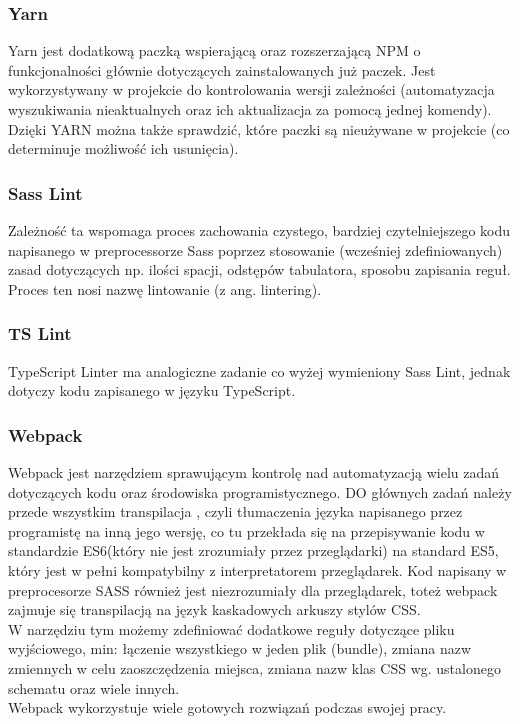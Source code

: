 \documentclass[eng,printmode]{mgr}
\begin{document}
\subsubsection{Yarn}
Yarn \cite{Yarn} jest dodatkową paczką wspierającą oraz rozszerzającą NPM o funkcjonalności głównie dotyczących  zainstalowanych już paczek. Jest wykorzystywany w projekcie do kontrolowania wersji zależności (automatyzacja wyszukiwania nieaktualnych oraz ich aktualizacja za pomocą jednej komendy). Dzięki YARN można także sprawdzić, które paczki są nieużywane w projekcie (co determinuje możliwość ich usunięcia).

\subsubsection{Sass Lint}
Zależność ta \cite{SassLint} wspomaga proces zachowania czystego, bardziej czytelniejszego kodu napisanego w preprocessorze  Sass poprzez stosowanie (wcześniej zdefiniowanych) zasad dotyczących np. ilości spacji, odstępów tabulatora, sposobu zapisania reguł. Proces ten nosi nazwę lintowanie (z ang. lintering).

\subsubsection{TS Lint}
TypeScript Linter \cite{TSLint} ma analogiczne zadanie co wyżej wymieniony Sass Lint, jednak dotyczy kodu zapisanego w języku TypeScript.

\subsubsection{Webpack}
Webpack \cite{Webpack} jest narzędziem sprawującym kontrolę nad automatyzacją wielu zadań dotyczących kodu oraz środowiska programistycznego. DO głównych zadań należy przede wszystkim transpilacja \cite{Keyword_Transpile}, czyli tłumaczenia języka napisanego przez programistę na inną jego wersję, co tu przekłada się na przepisywanie kodu w standardzie ES6(który nie jest zrozumiały przez przeglądarki) na standard ES5, który jest w pełni kompatybilny z interpretatorem przeglądarek. Kod napisany w preprocesorze SASS również jest niezrozumiały dla przeglądarek, toteż webpack zajmuje się transpilacją na język kaskadowych arkuszy stylów CSS.
\\
W narzędziu tym możemy zdefiniować dodatkowe reguły dotyczące pliku wyjściowego, min: łączenie wszystkiego w jeden plik (bundle), zmiana nazw zmiennych w celu zaoszczędzenia miejsca, zmiana nazw klas CSS wg. ustalonego schematu oraz wiele innych. 
\\
Webpack wykorzystuje wiele gotowych rozwiązań podczas swojej pracy.
\end{document}
